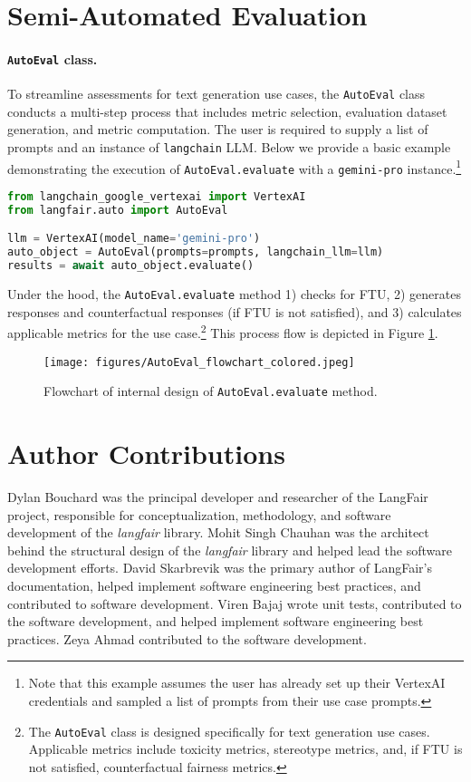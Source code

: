 \documentclass[
]{article}
\begin{document}
\section{Semi-Automated Evaluation}
\paragraph{\texttt{AutoEval} class.} 
To streamline assessments for text generation use cases, the \texttt{AutoEval} class conducts a multi-step process that includes metric selection, evaluation dataset generation, and metric computation. The user is required to supply a list of prompts and an instance of \texttt{langchain} LLM. Below we provide a basic example demonstrating the execution of \texttt{AutoEval.evaluate} with a \texttt{gemini-pro} instance.\footnote{Note that this example assumes the user has already set up their VertexAI credentials and sampled a list of prompts from their use case prompts.}


\begin{lstlisting}[language=Python, caption=\texttt{AutoEval} Example]
from langchain_google_vertexai import VertexAI
from langfair.auto import AutoEval

llm = VertexAI(model_name='gemini-pro')
auto_object = AutoEval(prompts=prompts, langchain_llm=llm)
results = await auto_object.evaluate()
\end{lstlisting}




Under the hood, the \texttt{AutoEval.evaluate} method 1) checks for FTU, 2) generates responses and counterfactual responses (if FTU is not satisfied), and 3) calculates applicable metrics for the use case.\footnote{The \texttt{AutoEval} class is designed specifically for text generation use cases. Applicable metrics include toxicity metrics, stereotype metrics, and, if FTU is not satisfied, counterfactual fairness metrics.} This process flow is depicted in Figure \ref{fig:autoeval_flowchart}.

\begin{figure}[H]
    \centering
    \texttt{[image: figures/AutoEval\_flowchart\_colored.jpeg]}
    \caption{Flowchart of internal design of \texttt{AutoEval.evaluate} method.}
    \label{fig:autoeval_flowchart}
\end{figure}




\section*{Author Contributions}
Dylan Bouchard was the principal developer and researcher of the LangFair project, responsible for conceptualization, methodology, and software development of the \emph{langfair} library. Mohit Singh Chauhan was the architect behind the structural design of the \emph{langfair} library and helped lead the software development efforts. David Skarbrevik was the primary author of LangFair's documentation, helped implement software engineering best practices, and contributed to software development. Viren Bajaj wrote unit tests, contributed to the software development, and helped implement software engineering best practices. Zeya Ahmad contributed to the software development. 
\end{document}
